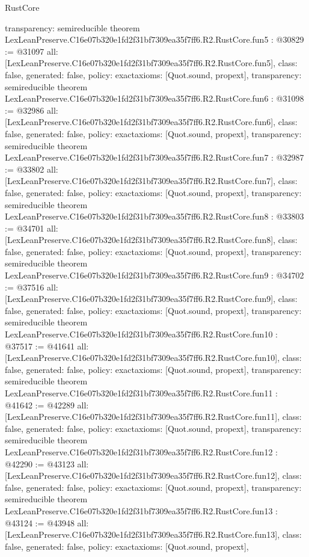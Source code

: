 \begin{lexlean}{RustCore}
\begin{coremodule}
{  transparency: semireducible
}
theorem LexLeanPreserve.C16e07b320e1fd2f31bf7309ea35f7ff6.R2.RustCore.fun5 : @30829 := @31097 {
  all: [LexLeanPreserve.C16e07b320e1fd2f31bf7309ea35f7ff6.R2.RustCore.fun5],
  class: false,
  generated: false,
  policy: exact{axioms: [Quot.sound, propext]},
  transparency: semireducible
}
theorem LexLeanPreserve.C16e07b320e1fd2f31bf7309ea35f7ff6.R2.RustCore.fun6 : @31098 := @32986 {
  all: [LexLeanPreserve.C16e07b320e1fd2f31bf7309ea35f7ff6.R2.RustCore.fun6],
  class: false,
  generated: false,
  policy: exact{axioms: [Quot.sound, propext]},
  transparency: semireducible
}
theorem LexLeanPreserve.C16e07b320e1fd2f31bf7309ea35f7ff6.R2.RustCore.fun7 : @32987 := @33802 {
  all: [LexLeanPreserve.C16e07b320e1fd2f31bf7309ea35f7ff6.R2.RustCore.fun7],
  class: false,
  generated: false,
  policy: exact{axioms: [Quot.sound, propext]},
  transparency: semireducible
}
theorem LexLeanPreserve.C16e07b320e1fd2f31bf7309ea35f7ff6.R2.RustCore.fun8 : @33803 := @34701 {
  all: [LexLeanPreserve.C16e07b320e1fd2f31bf7309ea35f7ff6.R2.RustCore.fun8],
  class: false,
  generated: false,
  policy: exact{axioms: [Quot.sound, propext]},
  transparency: semireducible
}
theorem LexLeanPreserve.C16e07b320e1fd2f31bf7309ea35f7ff6.R2.RustCore.fun9 : @34702 := @37516 {
  all: [LexLeanPreserve.C16e07b320e1fd2f31bf7309ea35f7ff6.R2.RustCore.fun9],
  class: false,
  generated: false,
  policy: exact{axioms: [Quot.sound, propext]},
  transparency: semireducible
}
theorem LexLeanPreserve.C16e07b320e1fd2f31bf7309ea35f7ff6.R2.RustCore.fun10 : @37517 := @41641 {
  all: [LexLeanPreserve.C16e07b320e1fd2f31bf7309ea35f7ff6.R2.RustCore.fun10],
  class: false,
  generated: false,
  policy: exact{axioms: [Quot.sound, propext]},
  transparency: semireducible
}
theorem LexLeanPreserve.C16e07b320e1fd2f31bf7309ea35f7ff6.R2.RustCore.fun11 : @41642 := @42289 {
  all: [LexLeanPreserve.C16e07b320e1fd2f31bf7309ea35f7ff6.R2.RustCore.fun11],
  class: false,
  generated: false,
  policy: exact{axioms: [Quot.sound, propext]},
  transparency: semireducible
}
theorem LexLeanPreserve.C16e07b320e1fd2f31bf7309ea35f7ff6.R2.RustCore.fun12 : @42290 := @43123 {
  all: [LexLeanPreserve.C16e07b320e1fd2f31bf7309ea35f7ff6.R2.RustCore.fun12],
  class: false,
  generated: false,
  policy: exact{axioms: [Quot.sound, propext]},
  transparency: semireducible
}
theorem LexLeanPreserve.C16e07b320e1fd2f31bf7309ea35f7ff6.R2.RustCore.fun13 : @43124 := @43948 {
  all: [LexLeanPreserve.C16e07b320e1fd2f31bf7309ea35f7ff6.R2.RustCore.fun13],
  class: false,
  generated: false,
  policy: exact{axioms: [Quot.sound, propext]},
}
\end{coremodule}
\end{lexlean}
